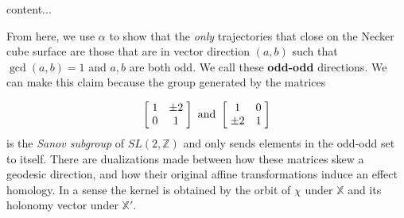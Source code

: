 \documentclass[]{article}
\begin{document}
\begin{cor}
content...
\end{cor}

From here, we use $\alpha$ to show that the \emph{only} trajectories that close on the Necker cube surface are those that are in vector direction $(a,b)$ such that $\gcd(a,b)=1$ and $a,b$ are both odd. We call these \textbf{odd-odd} directions. We can make this claim because the group generated by the matrices 

\begin{equation*}
\left[ \hspace{1mm} \begin{matrix}
				1 &  \pm 2\\
				0 & 1
			\end{matrix}\hspace{1mm}\right] \text{ and }
			\left[ \hspace{1mm} \begin{matrix}
							1 & 0\\
							 \pm 2 & 1
						\end{matrix}\hspace{1mm}\right]
\end{equation*}
is the \emph{Sanov subgroup} of $SL(2,\mathbb{Z})$ and only sends elements in the odd-odd set to itself. There are dualizations made between how these matrices skew a geodesic direction,  and how their original affine transformations induce an effect homology. In a sense the kernel is obtained by the orbit of $\chi$ under $\mathbb{X}$ and its holonomy vector under $\mathbb{X}'$.
\end{document}
